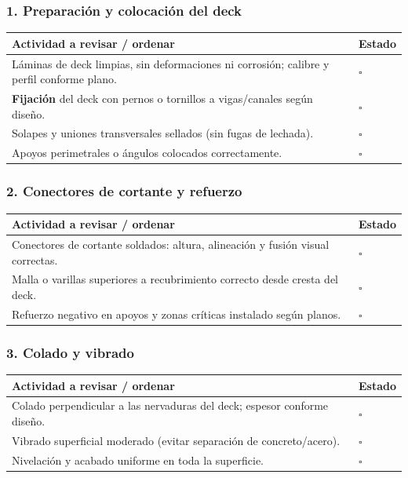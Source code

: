 \documentclass[12pt]{article}
\newcommand{\cbox}{\(\square\)}
\renewcommand{\cbox}{\(\square\)} %
\begin{document}
 \subsubsection*{1. Preparación y colocación del deck}
 \begin{tabularx}{\linewidth}{>{\raggedright\arraybackslash}p{0.93\linewidth} >{\centering\arraybackslash}m{0.07\linewidth}}
 	\toprule
 	\textbf{Actividad a revisar / ordenar} & \textbf{Estado}\\
 	\midrule
 	Láminas de deck limpias, sin deformaciones ni corrosión; calibre y perfil conforme plano. & \cbox \\
 	\textbf{Fijación} del deck con pernos o tornillos a vigas/canales según diseño. & \cbox \\
 	Solapes y uniones transversales sellados (sin fugas de lechada). & \cbox \\
 	Apoyos perimetrales o ángulos colocados correctamente. & \cbox \\
 	\bottomrule
 \end{tabularx}
 
 \subsubsection*{2. Conectores de cortante y refuerzo}
 \begin{tabularx}{\linewidth}{>{\raggedright\arraybackslash}p{0.93\linewidth} >{\centering\arraybackslash}m{0.07\linewidth}}
 	\toprule
 	\textbf{Actividad a revisar / ordenar} & \textbf{Estado}\\
 	\midrule
 	Conectores de cortante soldados: altura, alineación y fusión visual correctas. & \cbox \\
 	Malla o varillas superiores a recubrimiento correcto desde cresta del deck. & \cbox \\
 	Refuerzo negativo en apoyos y zonas críticas instalado según planos. & \cbox \\
 	\bottomrule
 \end{tabularx}
 
 \subsubsection*{3. Colado y vibrado}
 \begin{tabularx}{\linewidth}{>{\raggedright\arraybackslash}p{0.93\linewidth} >{\centering\arraybackslash}m{0.07\linewidth}}
 	\toprule
 	\textbf{Actividad a revisar / ordenar} & \textbf{Estado}\\
 	\midrule
 	Colado perpendicular a las nervaduras del deck; espesor conforme diseño. & \cbox \\
 	Vibrado superficial moderado (evitar separación de concreto/acero). & \cbox \\
 	Nivelación y acabado uniforme en toda la superficie. & \cbox \\
 	\bottomrule
 \end{tabularx}
 
\end{document}
